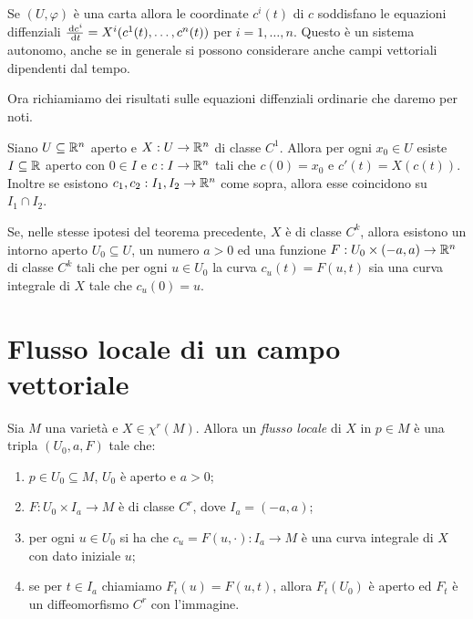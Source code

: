 Se $(U,\varphi)$ è una carta allora le coordinate $c^i(t)$ di $c$ soddisfano le equazioni diffenziali $\frac{\,\mathrm d c^i}{\,\mathrm d t}=X^i(c^1(t),\dots,c^n(t))$ per $i=1,\dots,n$. Questo è un sistema autonomo, anche se in generale si possono considerare anche campi vettoriali dipendenti dal tempo.
 
Ora richiamiamo dei risultati sulle equazioni diffenziali ordinarie che daremo per noti.
 
\begin{theorem}   \label{thm:CauchyLipschitz}
	Siano $U\subseteq\mathbb R^n$ aperto e $X:U\to\mathbb R^n$ di classe $C^1$. Allora per ogni $x_0\in U$ esiste $I\subseteq\mathbb R$ aperto con $0\in I$ e $c:I\to\mathbb R^n$ tali che $c(0)=x_0$ e $c'(t)=X(c(t))$. Inoltre se esistono $c_1,c_2:I_1,I_2\to\mathbb R^n$ come sopra, allora esse coincidono su $I_1\cap I_2$.
\end{theorem}

\begin{theorem} 
	Se, nelle stesse ipotesi del teorema precedente, $X$ è di classe $C^k$, allora esistono un intorno aperto $U_0\subseteq U$, un numero $a>0$ ed una funzione $F:U_0\times (-a,a)\to\mathbb R^n$ di classe $C^k$ tali che per ogni $u\in U_0$ la curva $c_u(t)=F(u,t)$ sia una curva integrale di $X$ tale che $c_u(0)=u$.
\end{theorem}

\section{Flusso locale di un campo vettoriale}

\begin{definition}\label{def:FlussoLocale} 
	Sia $M$ una varietà e $X\in\chi^r(M)$. Allora un \emph{flusso locale} di $X$ in $p\in M$ è una tripla $(U_0,a,F)$ tale che:
	\begin{enumerate}
	\item $p\in U_0\subseteq M$, $U_0$ è aperto e $a>0$; \label{FL:aperto}
	\item $F:U_0\times I_a\to M$ è di classe $C^r$, dove $I_a=(-a,a)$; \label{FL:Cr}
	\item per ogni $u\in U_0$ si ha che $c_u=F(u,\cdot):I_a\to M$ è una curva integrale di $X$ con dato iniziale $u$; \label{FL:curvaintegrale}
	\item se per $t\in I_a$ chiamiamo $F_t(u)=F(u,t)$, allora $F_t(U_0)$ è aperto ed $F_t$ è un diffeomorfismo $C^r$ con l'immagine. \label{FL:diffeo} %
	\end{enumerate}
\end{definition}

